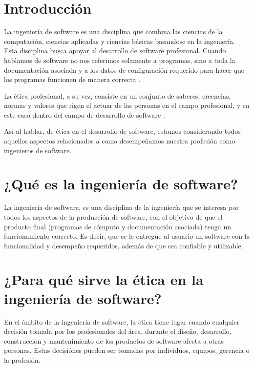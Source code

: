 \documentclass[twoside]{article}
\begin{document}
\begin{multicols}{2} %

\section{Introducción}

La ingeniería de software es una disciplina que combina las ciencias de la
computación, ciencias aplicadas y ciencias básicas basandose en la ingeniería.
Esta disciplina busca apoyar al desarrollo de software profesional. Cuando
hablamos de software no nos referimos solamente a programas, sino a toda la
documentación  asociada y a los datos de configuración requerido para hacer que
los programas funcionen de manera correcta \cite{sommerville2005ingenieria}.

La ética profesional, a su vez, consiste en un conjunto de saberes, creencias,
normas y valores que rigen el actuar de las personas en el campo profesional, y
en este caso dentro del campo de desarrollo de software
\cite{yuren2013etica}.

Así al hablar, de ética en el desarrollo de software, estamos considerando todos
aquellos aspectos relacionados a como desempeñamos nuestra profesión como
ingenieros de software.

\section{¿Qué es la ingeniería de software?}

La ingeniería de software, es una disciplina de la ingeniería que se interesa
por todos los aspectos de la producción de software, con el objetivo de que el
producto final (programas de cómputo y documentación asociada) tenga un
funcionamiento correcto. Es decir, que se le entregue al usuario un software con
la funcionalidad y desempeño requeridos, además de que sea confiable y
utilizable.

\section{¿Para qué sirve la ética en la ingeniería de software?}

En el ámbito de la ingeniería de software, la ética tiene lugar cuando cualquier
decisión tomada por los profesionales del área, durante el diseño, desarrollo,
construcción y mantenimiento de los productos de software afecta a otras
personas. Estas decisiónes pueden ser tomadas por individuos, equipos, gerencia
o la profesión.


\end{multicols}
\end{document}
